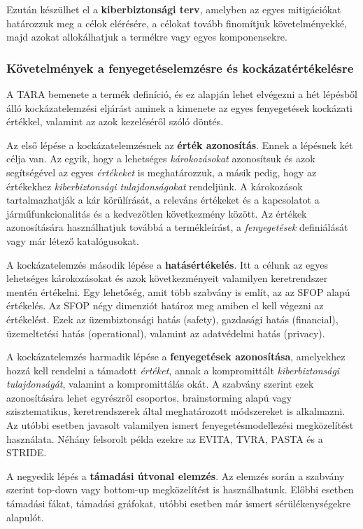 Ezután készülhet el a \textbf{kiberbiztonsági terv}, amelyben az egyes mitigációkat határozzuk meg a célok elérésére, a célokat tovább finomítjuk követelményekké, majd azokat allokálhatjuk a termékre vagy egyes komponensekre.

\subsubsection{Követelmények a fenyegetéselemzésre és kockázatértékelésre}
A TARA bemenete a termék definíció, és ez alapján lehet elvégezni a hét lépésből álló kockázatelemzési eljárást aminek a kimenete az egyes fenyegetések kockázati értékkel, valamint az azok kezeléséről szóló döntés.

Az első lépése a kockázatelemzésnek az \textbf{érték azonosítás}. Ennek a lépésnek két célja van. Az egyik, hogy a lehetséges \textit{károkozásokat} azonosítsuk és azok segítségével az egyes \textit{értékeket} is meghatározzuk, a másik pedig, hogy az értékekhez \textit{kiberbiztonsági tulajdonságokat} rendeljünk. 
A károkozások tartalmazhatják a kár körülírását, a releváns értékeket és a kapcsolatot a járműfunkcionalitás és a kedvezőtlen következmény között.
Az értékek azonosítására használhatjuk továbbá a termékleírást, a \textit{fenyegetések} definiálását vagy már létező katalógusokat.

A kockázatelemzés második lépése a \textbf{hatásértékelés}. Itt a célunk az egyes lehetséges károkozásokat és azok következményeit valamilyen keretrendszer mentén értékelni. Egy lehetőség, amit több szabvány is említ, az az SFOP alapú értékelés. Az SFOP négy dimenziót határoz meg amiben el kell végezni az értékelést. Ezek az üzembiztonsági hatás (safety), gazdasági hatás (financial), üzemeltetési hatás (operational), valamint az adatvédelmi hatás (privacy).

A kockázatelemzés harmadik lépése a \textbf{fenyegetések azonosítása}, amelyekhez hozzá kell rendelni a támadott \textit{értéket}, annak a kompromittált \textit{kiberbiztonsági tulajdonságát}, valamint a kompromittálás okát. A szabvány szerint ezek azonosítására lehet egyrészről csoportos, brainstorming alapú vagy szisztematikus, keretrendszerek által meghatározott módszereket is alkalmazni. Az utóbbi esetben javasolt valamilyen ismert fenyegetésmodellezési megközelítést használata. Néhány felsorolt példa ezekre az EVITA, TVRA, PASTA és a STRIDE.

A negyedik lépés a \textbf{támadási útvonal elemzés}. Az elemzés során a szabvány szerint top-down vagy bottom-up megközelítést is használhatunk. Előbbi esetben támadási fákat, támadási gráfokat, utóbbi esetben már ismert sérülékenységekre alapulót.

